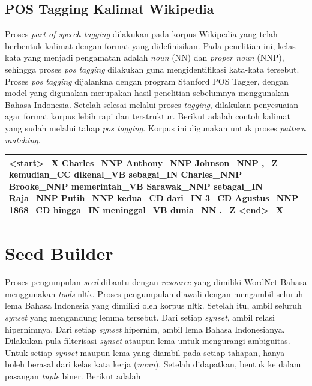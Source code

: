 \subsection{POS Tagging Kalimat Wikipedia}
Proses \textit{part-of-speech tagging} dilakukan pada korpus Wikipedia yang telah berbentuk kalimat dengan format yang didefinisikan. Pada penelitian ini, kelas kata yang menjadi pengamatan adalah \textit{noun} (NN) dan \textit{proper noun} (NNP), sehingga proses \textit{pos tagging} dilakukan guna mengidentifikasi kata-kata tersebut. Proses \textit{pos tagging} dijalankna dengan program Stanford POS Tagger, dengan model yang digunakan merupakan hasil penelitian sebelumnya menggunakan Bahasa Indonesia.  Setelah selesai melalui proses \textit{tagging}, dilakukan penyesuaian agar format korpus lebih rapi dan terstruktur. Berikut adalah contoh kalimat yang sudah melalui tahap \textit{pos tagging}. Korpus ini digunakan untuk proses \textit{pattern matching}.

\begin{center}
\begin{tabular}{ | m{32em} | } 
\hline
<start>\_X Charles\_NNP Anthony\_NNP Johnson\_NNP ,\_Z kemudian\_CC dikenal\_VB sebagai\_IN Charles\_NNP Brooke\_NNP memerintah\_VB Sarawak\_NNP sebagai\_IN Raja\_NNP Putih\_NNP kedua\_CD dari\_IN 3\_CD Agustus\_NNP 1868\_CD hingga\_IN meninggal\_VB dunia\_NN .\_Z <end>\_X \\ 
\hline
\end{tabular}
\end{center}


\section{Seed Builder}
Proses pengumpulan \textit{seed} dibantu dengan \textit{resource} yang dimiliki WordNet Bahasa menggunakan \textit{tools} nltk. Proses pengumpulan diawali dengan mengambil seluruh lema Bahasa Indonesia yang dimiliki oleh korpus nltk. Setelah itu, ambil seluruh \textit{synset} yang mengandung lemma tersebut. Dari setiap \textit{synset}, ambil relasi hipernimnya. Dari setiap \textit{synset} hipernim, ambil lema Bahasa Indonesianya. Dilakukan pula filterisasi \textit{synset} ataupun lema untuk mengurangi ambiguitas. Untuk setiap \textit{synset} maupun lema yang diambil pada setiap tahapan, hanya boleh berasal dari kelas kata kerja (\textit{noun}). Setelah didapatkan, bentuk ke dalam pasangan \textit{tuple} biner. Berikut adalah

